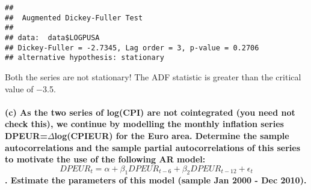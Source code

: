 \documentclass[]{article}
\newenvironment{Shaded}{\begin{snugshade}}{\end{snugshade}}
\newcommand{\DataTypeTok}[1]{\textcolor[rgb]{0.13,0.29,0.53}{#1}}
\newcommand{\DecValTok}[1]{\textcolor[rgb]{0.00,0.00,0.81}{#1}}
\newcommand{\KeywordTok}[1]{\textcolor[rgb]{0.13,0.29,0.53}{\textbf{#1}}}
\newcommand{\NormalTok}[1]{#1}
\newcommand{\OperatorTok}[1]{\textcolor[rgb]{0.81,0.36,0.00}{\textbf{#1}}}
\newcommand{\StringTok}[1]{\textcolor[rgb]{0.31,0.60,0.02}{#1}}
\let\oldparagraph\paragraph
\renewcommand{\paragraph}[1]{\oldparagraph{#1}\mbox{}}
\begin{document}
\begin{Shaded}
\end{Shaded}

\begin{verbatim}
## 
##  Augmented Dickey-Fuller Test
## 
## data:  data$LOGPUSA
## Dickey-Fuller = -2.7345, Lag order = 3, p-value = 0.2706
## alternative hypothesis: stationary
\end{verbatim}

Both the series are not stationary! The ADF statistic is greater than
the critical value of −3.5.

\hypertarget{c-as-the-two-series-of-logcpi-are-not-cointegrated-you-need-not-check-this-we-continue-by-modelling-the-monthly-inflation-series-dpeurdeltalogcpieur-for-the-euro-area.-determine-the-sample-autocorrelations-and-the-sample-partial-autocorrelations-of-this-series-to-motivate-the-use-of-the-following-ar-model-dpeur_t-alpha-beta_1dpeur_t-6beta_2dpeur_t-12epsilon_t.-estimate-the-parameters-of-this-model-sample-jan-2000---dec-2010.}{%
\paragraph{\texorpdfstring{(c) As the two series of log(CPI) are not
cointegrated (you need not check this), we continue by modelling the
monthly inflation series DPEUR=\(\Delta\)log(CPIEUR) for the Euro area.
Determine the sample autocorrelations and the sample partial
autocorrelations of this series to motivate the use of the following AR
model:
\[DPEUR_t = \alpha + \beta_1DPEUR_{t-6}+\beta_2DPEUR_{t-12}+\epsilon_t\].
Estimate the parameters of this model (sample Jan 2000 - Dec
2010).}{(c) As the two series of log(CPI) are not cointegrated (you need not check this), we continue by modelling the monthly inflation series DPEUR=\textbackslash Deltalog(CPIEUR) for the Euro area. Determine the sample autocorrelations and the sample partial autocorrelations of this series to motivate the use of the following AR model: DPEUR\_t = \textbackslash alpha + \textbackslash beta\_1DPEUR\_\{t-6\}+\textbackslash beta\_2DPEUR\_\{t-12\}+\textbackslash epsilon\_t. Estimate the parameters of this model (sample Jan 2000 - Dec 2010).}}\label{c-as-the-two-series-of-logcpi-are-not-cointegrated-you-need-not-check-this-we-continue-by-modelling-the-monthly-inflation-series-dpeurdeltalogcpieur-for-the-euro-area.-determine-the-sample-autocorrelations-and-the-sample-partial-autocorrelations-of-this-series-to-motivate-the-use-of-the-following-ar-model-dpeur_t-alpha-beta_1dpeur_t-6beta_2dpeur_t-12epsilon_t.-estimate-the-parameters-of-this-model-sample-jan-2000---dec-2010.}}
\end{document}
